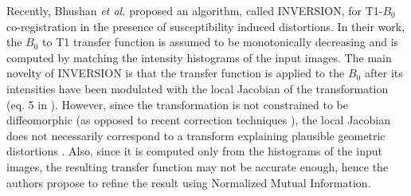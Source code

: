 Recently, Bhushan {\it et al.} \cite{Bhushan2015} proposed an algorithm, called INVERSION, for T1-$B_{0}$ co-registration in the presence of susceptibility induced distortions. In their work, the $B_0$ to T1 transfer function is assumed to be monotonically decreasing and is computed by matching the intensity histograms of the input images. The main novelty of INVERSION is that the transfer function is applied to the $B_0$ after its intensities have been modulated with the local Jacobian of the transformation (eq. 5 in \cite{Bhushan2015}). However, since the transformation is not constrained to be diffeomorphic (as opposed to recent correction techniques \cite{Ruthotto, Irfanoglu2015}), the local Jacobian does not necessarily correspond to a transform explaining plausible geometric distortions \cite{Chang1992}. Also, since it is computed only from the histograms of the input images, the resulting transfer function may not be accurate enough, hence the authors propose to refine the result using Normalized Mutual Information.


\vspace{-0.2cm}
